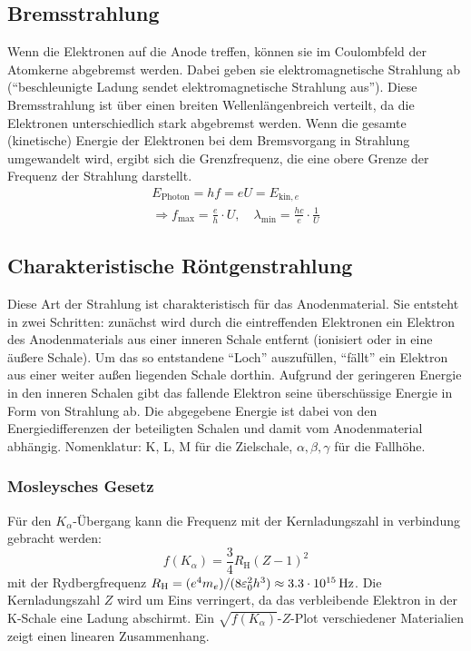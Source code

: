 \documentclass[a4paper]{scrartcl}
\begin{document}
\subsection{Bremsstrahlung}
Wenn die Elektronen auf die Anode treffen, können sie im Coulombfeld der Atomkerne abgebremst werden. Dabei geben sie elektromagnetische Strahlung ab ("`beschleunigte Ladung sendet elektromagnetische Strahlung aus"'). Diese Bremsstrahlung ist über einen breiten Wellenlängenbreich verteilt, da die Elektronen unterschiedlich stark abgebremst werden. Wenn die gesamte (kinetische) Energie der Elektronen bei dem Bremsvorgang in Strahlung umgewandelt wird, ergibt sich die Grenzfrequenz, die eine obere Grenze der Frequenz der Strahlung darstellt.
\begin{align*}
  E_{\text{Photon}} = hf = eU = E_{\text{kin}, e} \\
  \Rightarrow f_{\text{max}} = \frac{e}{h}\cdot U,\quad \lambda_{\text{min}} = \frac{hc}{e} \cdot \frac{1}{U}
  \label{equ:Grenzfrequenz}
\end{align*}

\subsection{Charakteristische Röntgenstrahlung}
Diese Art der Strahlung ist charakteristisch für das Anodenmaterial. Sie entsteht in zwei Schritten: zunächst wird durch die eintreffenden Elektronen ein Elektron des Anodenmaterials aus einer inneren Schale entfernt (ionisiert oder in eine äußere Schale). Um das so entstandene "`Loch"' auszufüllen, "`fällt"' ein Elektron aus einer weiter außen liegenden Schale dorthin. Aufgrund der geringeren Energie in den inneren Schalen gibt das fallende Elektron seine überschüssige Energie in Form von Strahlung ab. Die abgegebene Energie ist dabei von den Energiedifferenzen der beteiligten Schalen und damit vom Anodenmaterial abhängig. Nomenklatur: K, L, M für die Zielschale, $\alpha, \beta, \gamma$ für die Fallhöhe.

\subsubsection{Mosleysches Gesetz}
Für den $K_\alpha$-Übergang kann die Frequenz mit der Kernladungszahl in verbindung gebracht werden:
\begin{equation*}
  f(K_\alpha) = \frac{3}{4}R_\text{H}(Z-1)^2
  \label{equ:Mosley}
\end{equation*}
mit der Rydbergfrequenz $R_\text{H} = (e^4m_e)/(8\varepsilon_0^2h^3) \approx \unit[3.3\cdot10^{15}]{Hz}$. Die Kernladungszahl $Z$ wird um Eins verringert, da das verbleibende Elektron in der K-Schale eine Ladung abschirmt. Ein $\sqrt{f(K_\alpha)}$-$Z$-Plot verschiedener Materialien zeigt einen linearen Zusammenhang.
\end{document}

